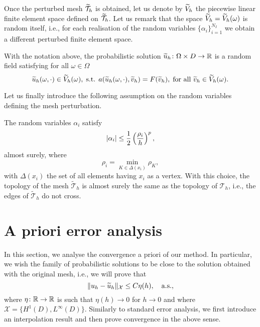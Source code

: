 \documentclass[10pt]{article}
\begin{document}
Once the perturbed mesh $\widetilde {\mathcal T}_h$ is obtained, let us denote by $\widetilde V_h$ the piecewise linear finite element space defined on $\widetilde {\mathcal T}_h$. Let us remark that the space $\widetilde V_h = \widetilde V_h(\omega)$ is random itself, i.e., for each realisation of the random variables $\{\alpha_i\}_{i=1}^{N_I}$ we obtain a different perturbed finite element space.


\begin{definition} \label{def:ProbSolution} With the notation above, the probabilistic solution $\widetilde u_h \colon \Omega \times D \to \mathbb{R}$ is a random field satisfying for all $\omega \in \Omega$
	\begin{equation}
		\widetilde u_h(\omega, \cdot) \in \widetilde V_h(\omega), \; \text{s.t. } a(\widetilde u_h(\omega, \cdot), \widetilde v_h) = F(\widetilde v_h), \; \text{for all } \widetilde v_h \in \widetilde V_h(\omega). 
	\end{equation}
\end{definition}

Let us finally introduce the following assumption on the random variables defining the mesh perturbation. 
\begin{assumption} \label{as:MeshPerturbation} The random variables $\alpha_i$ satisfy
	\begin{equation}
		\lvert\alpha_i\rvert \leq \frac12 \left(\frac{\rho_i}{h}\right)^p,
	\end{equation}
	almost surely, where
	\begin{equation}
		\rho_i = \min_{K \in \Delta(x_i)} \rho_K,
	\end{equation}
	with $\Delta(x_i)$ the set of all elements having $x_i$ as a vertex. With this choice, the topology of the mesh $\mathcal {\widetilde T}_h$ is almost surely the same as the topology of $\mathcal T_h$, i.e., the edges of $\mathcal {\widetilde T}_h$ do not cross.
\end{assumption}



\section{A priori error analysis}

In this section, we analyse the convergence a priori of our method. In particular, we wish the family of probabilistic solutions to be close to the solution obtained with the original mesh, i.e., we will prove that 
\begin{equation}\label{eq:DefProbConv}
	\lVert u_h - \widetilde u_h\rVert_{\mathcal X} \leq C\eta(h), \quad \text{a.s.},
\end{equation}
where $\eta \colon \mathbb{R} \to \mathbb{R}$ is such that $\eta(h) \to 0$ for $h \to 0$ and where $\mathcal X = \{H^1(D), L^\infty(D)\}$. Similarly to standard error analysis, we first introduce an interpolation result and then prove convergence in the above sense.
\end{document}
